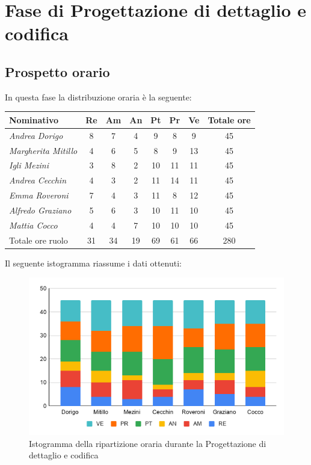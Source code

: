 {{{{{{\section{Fase di Progettazione di dettaglio e codifica}\label{PreventivoFaseDiProgettazioneDiDettaglioECodifica}

\subsection{Prospetto orario}\label{PreventivoFaseDiProgettazioneDiDettaglioECodificaProspettoOrario}
In questa fase la distribuzione oraria è la seguente:
\quad
\def\tabularxcolumn#1{m{#1}}
{

	\begin{center}
		\renewcommand{\arraystretch}{1.4}
		\begin{tabularx}{\textwidth}{|X|c|c|c|c|c|c|c|}
			\hline
			\rowcolor{airforceblue}
			\textbf{Nominativo} & \textbf{Re} & \textbf{Am} & \textbf{An} & \textbf{Pt} & \textbf{Pr} & \textbf{Ve} & \textbf{Totale ore}\\
			\hline
			\textit{Andrea Dorigo} & 8 & 7 & 4 & 9 & 8 & 9 & 45\\
			\hline
			\textit{Margherita Mitillo} & 4 & 6 & 5 & 8 & 9 & 13 & 45\\
			\hline
			\textit{Igli Mezini} & 3 & 8 & 2 & 10 & 11 & 11 & 45\\
			\hline
			\textit{Andrea Cecchin} & 4 & 3 & 2 & 11 & 14 & 11 & 45\\
			\hline
			\textit{Emma Roveroni} & 7 & 4 & 3 & 11 & 8 & 12 & 45\\
			\hline
			\textit{Alfredo Graziano} & 5 & 6 & 3 & 10 & 11 & 10 & 45\\
			\hline
			\textit{Mattia Cocco} & 4 & 4 & 7 & 10 & 10 & 10 & 45\\
			\hline
			Totale ore ruolo & 31 & 34 & 19 & 69 & 61 & 66 & 280\\
			\hline
		\end{tabularx}
	\end{center}
Il seguente istogramma riassume i dati ottenuti:
\begin{figure}[!h]
	\begin{center}
		\includegraphics[width=0.7\linewidth]{../immagini/pdp/istogramma_progettazione_dettaglio.png}
		\caption{Istogramma della ripartizione oraria durante la Progettazione di
			dettaglio e codifica}
	\end{center}
\end{figure}
\clearpage
}}}}}}}
